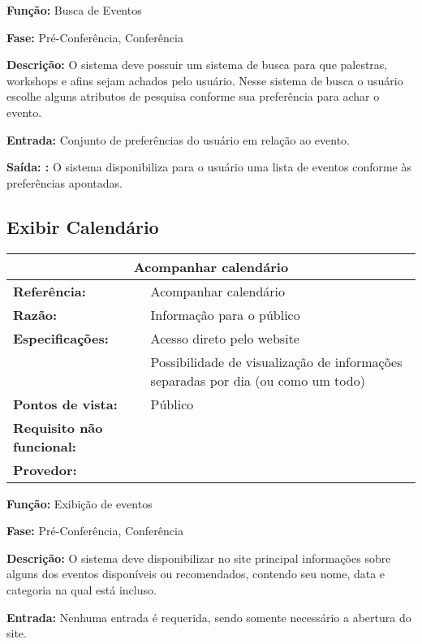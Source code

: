 \documentclass[letter]{article}
\begin{document}
\textbf{Função:} Busca de Eventos

\textbf{Fase: } Pré-Conferência, Conferência

\textbf{Descrição: } O sistema deve possuir um sistema de busca para que palestras, workshops e afins sejam achados pelo usuário. Nesse sistema de busca o usuário escolhe alguns atributos de pesquisa conforme sua preferência para achar o evento.

\textbf{Entrada: } Conjunto de preferências do usuário em relação ao evento.

\textbf{Saída: :} O sistema disponibiliza para o usuário uma lista de eventos conforme às preferências apontadas.



\subsection{ Exibir Calendário}


\begin{flushleft}
%
\begin{table}[h!]\begin{center}
\begin{tabular}{|ll|}
\hline 
\multicolumn{2}{|c|}{\textbf{Acompanhar calendário}}\tabularnewline
\hline
\textbf{Referência:} & Acompanhar calendário\tabularnewline
\textbf{Razão:} & Informação para o público\tabularnewline
\textbf{Especificações:} & Acesso direto pelo website\tabularnewline
 & Possibilidade de visualização de informações separadas por dia (ou
como um todo)\tabularnewline
\textbf{Pontos de vista:} & Público\tabularnewline
\textbf{Requisito não funcional:} & \tabularnewline
\textbf{Provedor:} & \tabularnewline
\hline\end{tabular}\end{center}
\end{table}

\par\end{flushleft}


%



\textbf{Função:} Exibição de eventos

\textbf{Fase: } Pré-Conferência, Conferência

\textbf{Descrição: } O sistema deve disponibilizar no site principal informações sobre alguns dos eventos disponíveis ou recomendados, contendo seu 
nome, data e categoria na qual está incluso.

\textbf{Entrada: } Nenhuma entrada é requerida, sendo somente necessário a
abertura do site.
\end{document}
